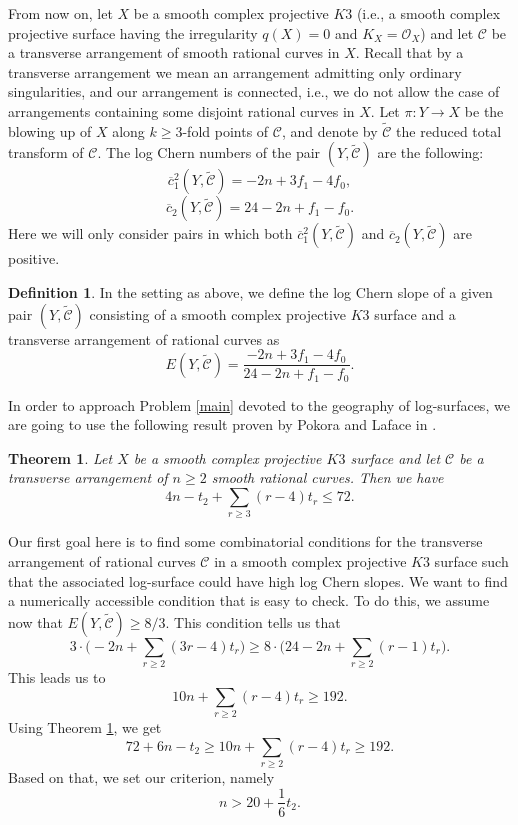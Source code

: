\documentclass{article}
\theoremstyle{plain}
\newtheorem{theorem}[thm]{Theorem}
\theoremstyle{definition}
\newtheorem{definition}[thm]{Definition}
\numberwithin{equation}{section}
\begin{document}
From now on, let $X$ be a smooth complex projective $K3$ (i.e., a smooth complex projective surface having the irregularity $q(X) = 0$ and $K_{X} = \mathcal{O}_{X}$) and let $\mathcal{C}$ be a transverse arrangement of smooth rational curves in $X$. Recall that by a transverse arrangement we mean an arrangement admitting only ordinary singularities, and our arrangement is connected, i.e., we do not allow the case of arrangements containing some disjoint rational curves in $X$. Let $\pi : Y \rightarrow X$ be the blowing up of $X$ along $k\geq 3$-fold points of $\mathcal{C}$, and denote by $\widetilde{\mathcal{C}}$ the reduced total transform of $\mathcal{C}$. The log Chern numbers of the pair $(Y, \widetilde{\mathcal{C}})$ are the following:
\[\overline{c}_{1}^{2}(Y, \widetilde{\mathcal{C}}) = - 2n + 3f_{1}-4f_{0},\]
\[\overline{c}_{2}(Y, \widetilde{\mathcal{C}})= 24 - 2n + f_{1} - f_{0}.\]
Here we will only consider pairs in which both $\overline{c}_1^2(Y, \widetilde{\mathcal{C}})$ and $\overline{c}_2(Y, \widetilde{\mathcal{C}})$ are positive.
\begin{definition}
In the setting as above, we define the log Chern slope of a given pair $(Y, \widetilde{\mathcal{C}})$ consisting of a smooth complex projective $K3$ surface and a transverse arrangement of rational curves as
\[E(Y, \widetilde{\mathcal{C}}) = \frac{- 2n + 3f_{1}-4f_{0}}{24 - 2n + f_{1}-f_{0}}.\]
\end{definition}
In order to approach Problem \ref{main} devoted to the geography of log-surfaces, we are going to use the following result proven by Pokora and Laface in \cite{LP}.
\begin{theorem}
\label{Hir}
Let $X$ be a smooth complex projective $K3$ surface and let $\mathcal{C}$ be a transverse arrangement  of $n\geq 2$ smooth rational curves. Then we have
\begin{equation}
4n - t_{2} + \sum_{r\geq 3}(r-4)t_{r} \leq 72.
\end{equation}
\end{theorem}
Our first goal here is to find some combinatorial conditions for the transverse arrangement of rational curves $\mathcal{C}$ in a smooth complex projective $K3$ surface such that the associated log-surface could have high log Chern slopes. We want to find a numerically accessible condition that is easy to check. To do this, we assume now that $E(Y, \widetilde{\mathcal{C}}) \geq 8/3$.
This condition tells us that
\[ 3\cdot\bigg(-2n + \sum_{r\geq 2}(3r-4)t_{r} \bigg) \geq 8 \cdot \bigg(24 - 2n + \sum_{r\geq 2}(r-1)t_{r} \bigg).\]
This leads us to
\begin{equation}
10n + \sum_{r\geq 2}(r-4)t_{r} \geq 192.
\end{equation}
Using Theorem \ref{Hir}, we get
\[72+6n - t_{2}\geq 10n + \sum_{r\geq 2}(r-4)t_{r} \geq 192.\]
Based on that, we set our criterion, namely
\begin{equation}
\label{condition}
n > 20 + \frac{1}{6}t_{2}.
\end{equation}
\end{document}
